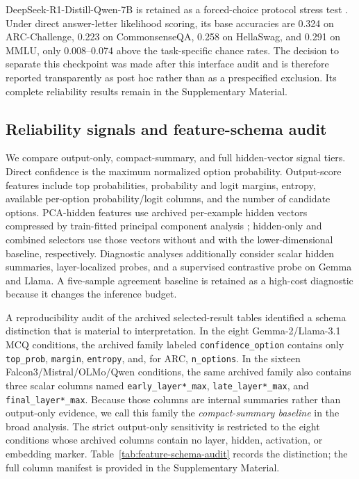 \documentclass[preprint,12pt,authoryear]{elsarticle}
\begin{document}

\FloatBarrier

DeepSeek-R1-Distill-Qwen-7B is retained as a forced-choice protocol stress test \citep{deepseek2025r1}. Under direct answer-letter likelihood scoring, its base accuracies are 0.324 on ARC-Challenge, 0.223 on CommonsenseQA, 0.258 on HellaSwag, and 0.291 on MMLU, only 0.008--0.074 above the task-specific chance rates. The decision to separate this checkpoint was made after this interface audit and is therefore reported transparently as post hoc rather than as a prespecified exclusion. Its complete reliability results remain in the Supplementary Material.

\subsection{Reliability signals and feature-schema audit}
We compare output-only, compact-summary, and full hidden-vector signal tiers. Direct confidence is the maximum normalized option probability. Output-score features include top probabilities, probability and logit margins, entropy, available per-option probability/logit columns, and the number of candidate options. PCA-hidden features use archived per-example hidden vectors compressed by train-fitted principal component analysis \citep{jolliffe2002pca}; hidden-only and combined selectors use those vectors without and with the lower-dimensional baseline, respectively. Diagnostic analyses additionally consider scalar hidden summaries, layer-localized probes, and a supervised contrastive probe on Gemma and Llama. A five-sample agreement baseline is retained as a high-cost diagnostic because it changes the inference budget.

A reproducibility audit of the archived selected-result tables identified a schema distinction that is material to interpretation. In the eight Gemma-2/Llama-3.1 MCQ conditions, the archived family labeled \texttt{confidence\_option} contains only \texttt{top\_prob}, \texttt{margin}, \texttt{entropy}, and, for ARC, \texttt{n\_options}. In the sixteen Falcon3/Mistral/OLMo/Qwen conditions, the same archived family also contains three scalar columns named \texttt{early\_layer*\_max}, \texttt{late\_layer*\_max}, and \texttt{final\_layer*\_max}. Because those columns are internal summaries rather than output-only evidence, we call this family the \emph{compact-summary baseline} in the broad analysis. The strict output-only sensitivity is restricted to the eight conditions whose archived columns contain no layer, hidden, activation, or embedding marker. Table~\ref{tab:feature-schema-audit} records the distinction; the full column manifest is provided in the Supplementary Material.
\end{document}
